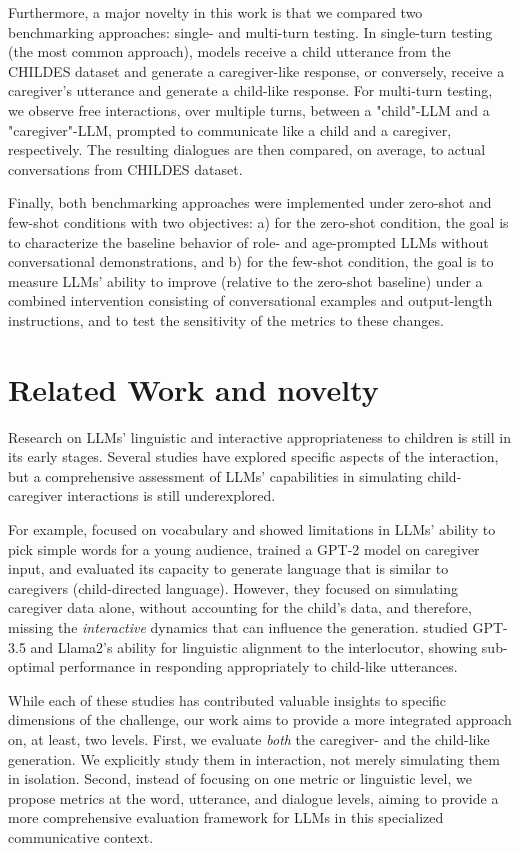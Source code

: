 Furthermore, a major novelty in this work is that we compared two benchmarking approaches: single- and multi-turn testing. In single-turn testing (the most common approach), models receive a child utterance from the CHILDES dataset and generate a caregiver-like response, or conversely, receive a caregiver's utterance and generate a child-like response. For multi-turn testing, we observe free interactions, over multiple turns, between a "child"-LLM and a "caregiver"-LLM, prompted to communicate like a child and a caregiver, respectively. The resulting dialogues are then compared, on average, to actual conversations from CHILDES dataset.

Finally, both benchmarking approaches were implemented under zero-shot and few-shot conditions with two objectives: a) for the zero-shot condition, the goal is to characterize the baseline behavior of role- and age-prompted LLMs without conversational demonstrations, and b) for the few-shot condition, the goal is to measure LLMs' ability to improve (relative to the zero-shot baseline) under a combined intervention consisting of conversational examples and output-length instructions, and to test the sensitivity of the metrics to these changes.

\section{Related Work and novelty}

Research on LLMs' linguistic and interactive appropriateness to children is still in its early stages. Several studies have explored specific aspects of the interaction, but a comprehensive assessment of LLMs' capabilities in simulating child-caregiver interactions is still underexplored.

For example,  \citet{valentini2023automatic} focused on vocabulary and showed limitations in LLMs' ability to pick simple words for a young audience,
\citet{rasanen2024age} trained a GPT-2 model on caregiver input, and evaluated its capacity to generate language that is similar to caregivers (child-directed language). However, they focused on simulating caregiver data alone, without accounting for the child's data, and therefore, missing the \textit{interactive} dynamics that can influence the generation. \citet{french2024aligning} studied GPT-3.5 and Llama2's ability for linguistic alignment to the interlocutor, showing sub-optimal performance in responding appropriately to child-like utterances. 

While each of these studies has contributed valuable insights to specific dimensions of the challenge, our work aims to provide a more integrated approach on, at least, two levels. First, we evaluate \textit{both} the caregiver- and the child-like generation. We explicitly study them in interaction, not merely simulating them in isolation. Second, instead of focusing on one metric or linguistic level, we propose metrics at the word, utterance, and dialogue levels, aiming to provide a more comprehensive evaluation framework for LLMs in this specialized communicative context.

